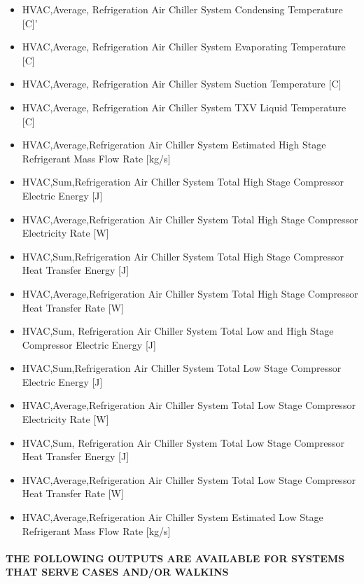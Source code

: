 \begin{itemize}
\item
  HVAC,Average, Refrigeration Air Chiller System Condensing Temperature {[}C{]}'
\item
  HVAC,Average, Refrigeration Air Chiller System Evaporating Temperature {[}C{]}
\item
  HVAC,Average, Refrigeration Air Chiller System Suction Temperature {[}C{]}
\item
  HVAC,Average, Refrigeration Air Chiller System TXV Liquid Temperature {[}C{]}
\item
  HVAC,Average,Refrigeration Air Chiller System Estimated High Stage Refrigerant Mass Flow Rate {[}kg/s{]}
\item
  HVAC,Sum,Refrigeration Air Chiller System Total High Stage Compressor Electric Energy {[}J{]}
\item
  HVAC,Average,Refrigeration Air Chiller System Total High Stage Compressor Electricity Rate {[}W{]}
\item
  HVAC,Sum,Refrigeration Air Chiller System Total High Stage Compressor Heat Transfer Energy {[}J{]}
\item
  HVAC,Average,Refrigeration Air Chiller System Total High Stage Compressor Heat Transfer Rate {[}W{]}
\item
  HVAC,Sum, Refrigeration Air Chiller System Total Low and High Stage Compressor Electric Energy {[}J{]}
\item
  HVAC,Sum,Refrigeration Air Chiller System Total Low Stage Compressor Electric Energy {[}J{]}
\item
  HVAC,Average,Refrigeration Air Chiller System Total Low Stage Compressor Electricity Rate {[}W{]}
\item
  HVAC,Sum, Refrigeration Air Chiller System Total Low Stage Compressor Heat Transfer Energy {[}J{]}
\item
  HVAC,Average,Refrigeration Air Chiller System Total Low Stage Compressor Heat Transfer Rate {[}W{]}
\item
  HVAC,Average,Refrigeration Air Chiller System Estimated Low Stage Refrigerant Mass Flow Rate {[}kg/s{]}
\end{itemize}

\paragraph{THE FOLLOWING OUTPUTS ARE AVAILABLE FOR SYSTEMS THAT SERVE CASES AND/OR WALKINS}\label{the-following-outputs-are-available-for-systems-that-serve-cases-andor-walkins}

